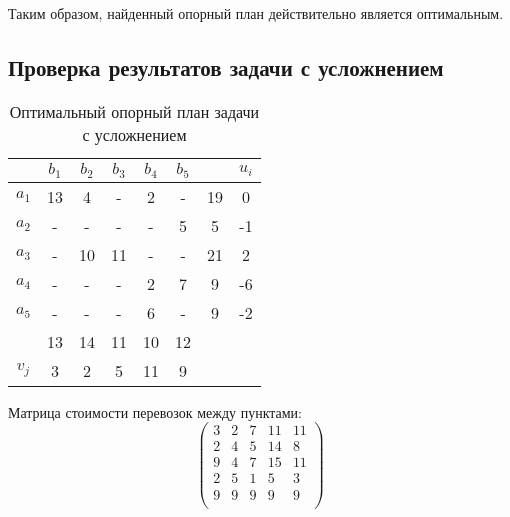 \documentclass[../body.tex]{subfiles}
\begin{document}
Таким образом, найденный опорный план действительно является оптимальным.

\subsection{Проверка результатов задачи с усложнением}
\begin{table}[h]
    \centering
    \begin{tabular}{|c|c|c|c|c|c||c||c|}
        \hline
        & $b_1$ & $b_2$ & $b_3$ & $b_4$ & $b_5$ & & $u_i$ \\\hline
        $a_1$ & 13 & 4 & - & 2 & - & 19 & 0\\\hline
        $a_2$ & - & - & - & - & 5 & 5 & -1\\\hline
        $a_3$ & - & 10 & 11 & - & - & 21 & 2\\\hline
        $a_4$ & - & - & - & 2 & 7 & 9 & -6\\\hline
        $a_5$ & - & - & - & 6 & - & 9 & -2\\\hline
        & 13 & 14 & 11 & 10 & 12 & &\\\hline
        \hline
        $v_j$ & 3 & 2 & 5 & 11 & 9 & &\\\hline
    \end{tabular}
    \caption{Оптимальный опорный план задачи с усложнением}
\end{table}

Матрица стоимости перевозок между пунктами:
$$\begin{pmatrix}
    3 & 2 & 7 & 11 & 11\\
    2 & 4 & 5 & 14 & 8\\
    9 & 4 & 7 & 15 & 11\\
    2 & 5 & 1 & 5 & 3\\
    9 & 9 & 9 & 9 & 9\\
\end{pmatrix}$$
\end{document}

